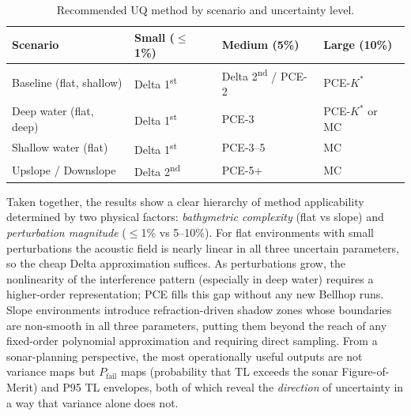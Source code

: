 \documentclass[11pt,a4paper]{article}
\begin{document}
\begin{table}[H]
  \centering
  \caption{Recommended UQ method by scenario and uncertainty level.}
  \label{tab:recommendation}
  \begin{tabular}{llll}
    \toprule
    Scenario & Small ($\leq$1\%) & Medium (5\%) & Large (10\%) \\
    \midrule
    Baseline (flat, shallow)   & Delta 1\textsuperscript{st}  & Delta 2\textsuperscript{nd} / PCE-2 & PCE-$K^*$ \\
    Deep water (flat, deep)    & Delta 1\textsuperscript{st}  & PCE-3                               & PCE-$K^*$ or MC \\
    Shallow water (flat)       & Delta 1\textsuperscript{st}  & PCE-3--5                            & MC \\
    Upslope / Downslope        & Delta 2\textsuperscript{nd}  & PCE-5+                              & MC \\
    \bottomrule
  \end{tabular}
\end{table}

Taken together, the results show a clear hierarchy of method applicability
determined by two physical factors: \emph{bathymetric complexity} (flat vs
slope) and \emph{perturbation magnitude} ($\leq$1\% vs 5--10\%).
For flat environments with small perturbations the acoustic field is nearly
linear in all three uncertain parameters, so the cheap Delta approximation
suffices.  As perturbations grow, the nonlinearity of the interference pattern
(especially in deep water) requires a higher-order representation; PCE fills
this gap without any new Bellhop runs.  Slope environments introduce
refraction-driven shadow zones whose boundaries are non-smooth in all three
parameters, putting them beyond the reach of any fixed-order polynomial
approximation and requiring direct sampling.  From a sonar-planning perspective,
the most operationally useful outputs are not variance maps but
$P_\mathrm{fail}$ maps (probability that TL exceeds the sonar Figure-of-Merit)
and P95 TL envelopes, both of which reveal the \emph{direction} of uncertainty
in a way that variance alone does not.
\end{document}
